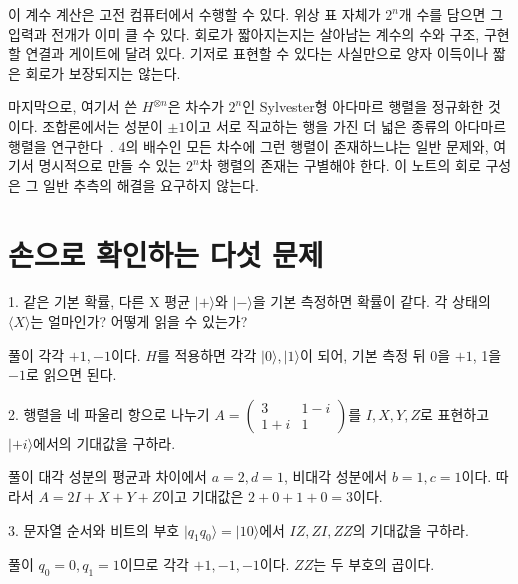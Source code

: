 이 계수 계산은 고전 컴퓨터에서 수행할 수 있다.
위상 표 자체가 \(2^n\)개 수를 담으면 그 입력과 전개가 이미 클 수 있다.
회로가 짧아지는지는 살아남는 계수의 수와 구조, 구현할 연결과 게이트에 달려 있다.
기저로 표현할 수 있다는 사실만으로 양자 이득이나 짧은 회로가 보장되지는 않는다.

마지막으로, 여기서 쓴 \(H^{\otimes n}\)은 차수가 \(2^n\)인 Sylvester형
아다마르 행렬을 정규화한 것이다. 조합론에서는 성분이 \(\pm1\)이고 서로 직교하는
행을 가진 더 넓은 종류의 아다마르 행렬을 연구한다~\cite{egan}.
4의 배수인 모든 차수에 그런 행렬이 존재하느냐는 일반 문제와,
여기서 명시적으로 만들 수 있는 \(2^n\)차 행렬의 존재는 구별해야 한다.
이 노트의 회로 구성은 그 일반 추측의 해결을 요구하지 않는다.

\section{손으로 확인하는 다섯 문제}

\begin{questionbox}{1. 같은 기본 확률, 다른 X 평균}
\(\lvert+\rangle\)와 \(\lvert-\rangle\)을 기본 측정하면 확률이 같다.
각 상태의 \(\langle X\rangle\)는 얼마인가? 어떻게 읽을 수 있는가?
\end{questionbox}
\begin{answerbox}{풀이}
각각 \(+1,-1\)이다. \(H\)를 적용하면 각각 \(\lvert0\rangle,\lvert1\rangle\)이 되어,
기본 측정 뒤 0을 \(+1\), 1을 \(-1\)로 읽으면 된다.
\end{answerbox}

\begin{questionbox}{2. 행렬을 네 파울리 항으로 나누기}
\(A=\begin{pmatrix}3&1-i\\1+i&1\end{pmatrix}\)를
\(I,X,Y,Z\)로 표현하고 \(\lvert+i\rangle\)에서의 기대값을 구하라.
\end{questionbox}
\begin{answerbox}{풀이}
대각 성분의 평균과 차이에서 \(a=2,d=1\), 비대각 성분에서 \(b=1,c=1\)이다.
따라서 \(A=2I+X+Y+Z\)이고 기대값은 \(2+0+1+0=3\)이다.
\end{answerbox}

\begin{questionbox}{3. 문자열 순서와 비트의 부호}
\(\lvert q_1q_0\rangle=\lvert10\rangle\)에서
\(IZ,ZI,ZZ\)의 기대값을 구하라.
\end{questionbox}
\begin{answerbox}{풀이}
\(q_0=0,q_1=1\)이므로 각각 \(+1,-1,-1\)이다.
\(ZZ\)는 두 부호의 곱이다.
\end{answerbox}


